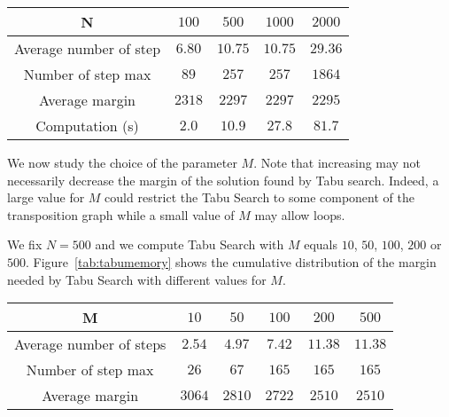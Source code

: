 \begin{center}
\begin{tabular}{ |c|c|c|c|c| }
\hline
    N & $100$&$500$& $1000$& $2000$\\
    \hline
    Average number of step & $6.80$ & $10.75$& $10.75$& $29.36$\\
    \hline
    Number of step max & $89$ & $257$& $257$& $1864$\\

    \hline

     Average margin & $2318$ & $2297$& $2297$& $2295$\\

    \hline
    Computation (s) & $2.0$ & $10.9$& $27.8$& $81.7$\\

    \hline
 \end{tabular}
\end{center}




We now study the choice of the parameter $M$. Note that increasing may not necessarily decrease the margin
of the solution found by Tabu search. Indeed, a large value for $M$ could restrict the Tabu Search to some component of the transposition graph while a small value of $M$ may allow loops.

We fix $N = 500$ and we compute Tabu Search with $M$ equals $10$, $50$, $100$, $200$ or $500$.
Figure~\ref{tab:tabumemory} shows the cumulative distribution of the margin needed by Tabu Search with different values for $M$. 

\begin{center}
\begin{tabular}{ |c|c|c|c|c|c| }
\hline
    M & $10$&$50$& $100$& $200$& $500$\\
    \hline
    Average number of steps & $2.54$ & $4.97$& $7.42$& $11.38$ & $11.38$\\
    \hline
    Number of step max & $26$ & $67$& $165$& $165$ & $165$\\
    \hline
     Average margin & $3064$ & $2810$& $2722$& $2510$ & $2510$\\
    \hline
 \end{tabular}
\end{center}

